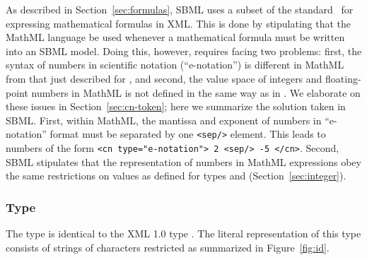 As described in Section~\ref{sec:formulas}, SBML uses a subset of
the \mathmltwo standard~\citep{w3c:2000b} for expressing
mathematical formulas in XML.  This is done by stipulating that
the MathML language be used whenever a mathematical formula must
be written into an SBML model.  Doing this, however, requires
facing two problems: first, the syntax of numbers in scientific
notation (``e-notation'') is different in MathML from that just
described for , and second, the value space of
integers and floating-point numbers in MathML is not defined in
the same way as in \xmlschemaone.  We elaborate on these issues in
Section~\ref{sec:cn-token}; here we summarize the solution taken
in SBML.  First, within MathML, the mantissa and exponent of
numbers in ``e-notation'' format must be separated by one
\texttt{<sep/>} element.  This leads to numbers of the form
\texttt{<cn type="e-notation"> 2 <sep/> -5 </cn>}.  Second, SBML
stipulates that the representation of numbers in MathML
expressions obey the same restrictions on values as defined for
types  and 
(Section~\ref{sec:integer}).


\subsubsection{Type }
\label{sec:id}

The \xmlschemaone type  is identical to the XML 1.0
type .  The literal representation of this type
consists of strings of characters restricted as summarized in
Figure~\ref{fig:id}.



